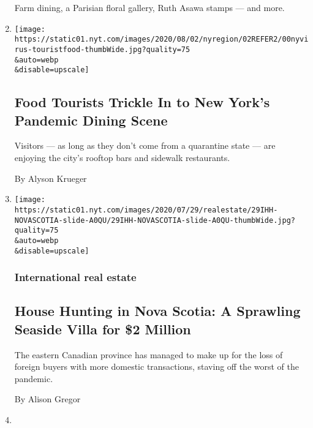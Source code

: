 \begin{enumerate}
  Farm dining, a Parisian floral gallery, Ruth Asawa stamps --- and
  more.
\item
  \href{/2020/07/30/nyregion/coronavirus-nyc-tourism-restaurants.html}{}

  \texttt{[image: https://static01.nyt.com/images/2020/08/02/nyregion/02REFER2/00nyvirus-touristfood-thumbWide.jpg?quality=75\\\&auto=webp\\\&disable=upscale]}

  \hypertarget{food-tourists-trickle-in-to-new-yorks-pandemic-dining-scene}{%
  \subsection{Food Tourists Trickle In to New York's Pandemic Dining
  Scene}\label{food-tourists-trickle-in-to-new-yorks-pandemic-dining-scene}}

  Visitors --- as long as they don't come from a quarantine state ---
  are enjoying the city's rooftop bars and sidewalk restaurants.

  By Alyson Krueger
\item
  \href{/2020/07/29/realestate/house-hunting-in-nova-scotia-a-sprawling-seaside-villa-for-2-million.html}{}

  \texttt{[image: https://static01.nyt.com/images/2020/07/29/realestate/29IHH-NOVASCOTIA-slide-A0QU/29IHH-NOVASCOTIA-slide-A0QU-thumbWide.jpg?quality=75\\\&auto=webp\\\&disable=upscale]}

  \hypertarget{international-real-estate}{%
  \subsubsection{International real
  estate}\label{international-real-estate}}

  \hypertarget{house-hunting-in-nova-scotia-a-sprawling-seaside-villa-for-2-million}{%
  \subsection{House Hunting in Nova Scotia: A Sprawling Seaside Villa
  for \$2
  Million}\label{house-hunting-in-nova-scotia-a-sprawling-seaside-villa-for-2-million}}

  The eastern Canadian province has managed to make up for the loss of
  foreign buyers with more domestic transactions, staving off the worst
  of the pandemic.

  By Alison Gregor
\item
  \href{/2020/07/29/nyregion/lake-solitude-closed-racism.html}{}


\end{enumerate}
